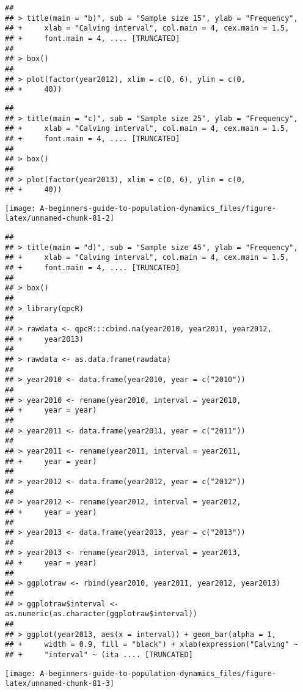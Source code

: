 \documentclass[]{book}
\begin{document}
\begin{verbatim}
## 
## > title(main = "b)", sub = "Sample size 15", ylab = "Frequency", 
## +     xlab = "Calving interval", col.main = 4, cex.main = 1.5, 
## +     font.main = 4, .... [TRUNCATED] 
## 
## > box()
## 
## > plot(factor(year2012), xlim = c(0, 6), ylim = c(0, 
## +     40))
\end{verbatim}

\begin{verbatim}
## 
## > title(main = "c)", sub = "Sample size 25", ylab = "Frequency", 
## +     xlab = "Calving interval", col.main = 4, cex.main = 1.5, 
## +     font.main = 4, .... [TRUNCATED] 
## 
## > box()
## 
## > plot(factor(year2013), xlim = c(0, 6), ylim = c(0, 
## +     40))
\end{verbatim}

\begin{center}\texttt{[image: A-beginners-guide-to-population-dynamics\_files/figure-latex/unnamed-chunk-81-2]} \end{center}

\begin{verbatim}
## 
## > title(main = "d)", sub = "Sample size 45", ylab = "Frequency", 
## +     xlab = "Calving interval", col.main = 4, cex.main = 1.5, 
## +     font.main = 4, .... [TRUNCATED] 
## 
## > box()
## 
## > library(qpcR)
## 
## > rawdata <- qpcR:::cbind.na(year2010, year2011, year2012, 
## +     year2013)
## 
## > rawdata <- as.data.frame(rawdata)
## 
## > year2010 <- data.frame(year2010, year = c("2010"))
## 
## > year2010 <- rename(year2010, interval = year2010, 
## +     year = year)
## 
## > year2011 <- data.frame(year2011, year = c("2011"))
## 
## > year2011 <- rename(year2011, interval = year2011, 
## +     year = year)
## 
## > year2012 <- data.frame(year2012, year = c("2012"))
## 
## > year2012 <- rename(year2012, interval = year2012, 
## +     year = year)
## 
## > year2013 <- data.frame(year2013, year = c("2013"))
## 
## > year2013 <- rename(year2013, interval = year2013, 
## +     year = year)
## 
## > ggplotraw <- rbind(year2010, year2011, year2012, year2013)
## 
## > ggplotraw$interval <- as.numeric(as.character(ggplotraw$interval))
## 
## > ggplot(year2013, aes(x = interval)) + geom_bar(alpha = 1, 
## +     width = 0.9, fill = "black") + xlab(expression("Calving" ~ 
## +     "interval" ~ (ita .... [TRUNCATED]
\end{verbatim}

\begin{center}\texttt{[image: A-beginners-guide-to-population-dynamics\_files/figure-latex/unnamed-chunk-81-3]} \end{center}
\end{document}
